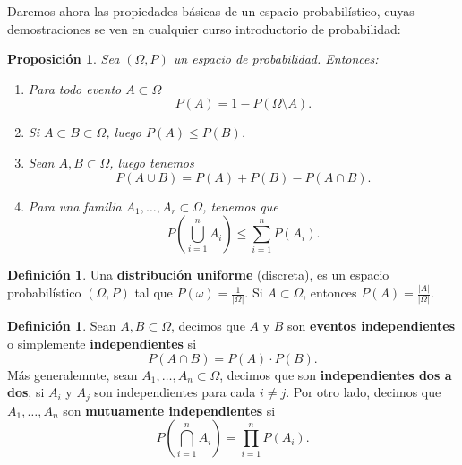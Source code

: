 \documentclass[12pt]{report}
\theoremstyle{plain}
\newtheorem{proposition}[theorem]{Proposición}
\theoremstyle{definition}
\newtheorem{definition}[theorem]{Definición}
\newcommand{\abs}[1]{\left \vert #1 \right \vert}
\begin{document}
Daremos ahora las propiedades básicas de un espacio probabilístico, cuyas demostraciones se ven en cualquier curso introductorio de probabilidad:
\begin{proposition}
Sea $(\Omega, P)$ un espacio de probabilidad. Entonces:
\begin{enumerate}[(1)]
\item Para todo evento $A \subset \Omega$
\[
    P(A) = 1 - P (\Omega \setminus A).
\]
\item Si $A \subset B \subset \Omega$, luego $P(A) \leq P(B)$.
\item Sean $A,B \subset \Omega$, luego tenemos
\[
    P(A \cup B) = P(A) + P(B) - P(A \cap B).
\]
\item Para una familia $A_1, \ldots, A_r \subset \Omega$, tenemos que
\[
    P(\bigcup_{i = 1}^n A_i) \leq \sum_{i = 1}^n P(A_i).
\]
\end{enumerate}
\end{proposition}

\begin{definition}
Una \textbf{distribución uniforme} (discreta), es un espacio probabilístico $(\Omega, P)$ tal que $P (\omega) = \frac{1}{\abs \Omega}$. Si $A \subset \Omega$, entonces $P(A) = \frac{\abs A}{\abs \Omega}$.
\end{definition}

\begin{definition}
Sean $A,B \subset \Omega$, decimos que $A$ y $B$ son \textbf{eventos independientes} o simplemente \textbf{independientes} si
\[
    P(A \cap B) = P(A) \cdot P(B).
\]
Más generalemnte, sean $A_1, \ldots, A_n \subset \Omega$, decimos que son \textbf{independientes dos a dos}, si $A_i $ y $A_j$ son independientes para cada $i \neq j$. Por otro lado, decimos que $A_1, \ldots, A_n$ son \textbf{mutuamente independientes} si
\[
    P(\bigcap_{i = 1}^n A_i) = \prod_{i = 1}^n P(A_i).
\]
\end{definition}
\end{document}
